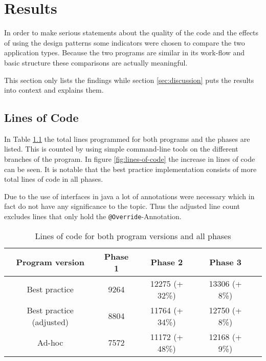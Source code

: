 \chapter{Results}
\label{sec:results}
In order to make serious statements about the quality of the code and the effects of using the design patterns some indicators were chosen to compare the two application types. Because the two programs are similar in its work-flow and basic structure these comparisons are actually meaningful.

This section only lists the findings while section \ref{sec:discussion} puts the results into context and explains them.

\section{Lines of Code}
\label{sec:line-count}
In Table \ref{table:lines-of-code} the total lines programmed for both programs and the phases are listed. This is counted by using simple command-line tools on the different branches of the program. In figure \ref{fig:lines-of-code} the  increase in lines of code can be seen. It is notable that the best practice implementation consists of more total lines of code in all phases. 

Due to the use of interfaces in java a lot of annotations were necessary which in fact do not have any significance to the topic. Thus the adjusted line count excludes lines that only hold the \texttt{@Override}-Annotation.

\begin{table}[htbp]
	\centering

	\begin{tabular}{|c|c|c|c|c|} \hline
	\textbf{Program version} &\textbf{Phase 1} & \textbf{Phase 2} & \textbf{Phase 3} \\ \hline
	Best practice & 9264 & 12275 (+ 32\%)& 13306 (+ 8\%)\\ \hline
	Best practice (adjusted) & 8804 & 11764 (+ 34\%)& 12750 (+ 8\%)\\ \hline
	Ad-hoc & 7572 & 11172 (+ 48\%)& 12168 (+ 9\%)\\ \hline
	\end{tabular}
	\caption{Lines of code for both program versions and all phases}
	\label{table:lines-of-code}
\end{table}

